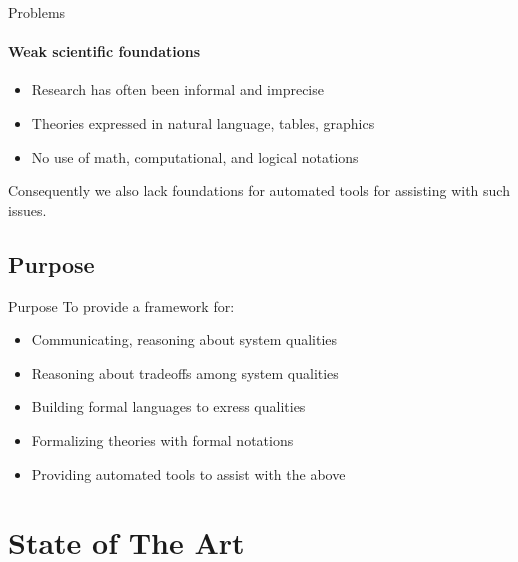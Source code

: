 \documentclass[xcolor=x11names,compress]{beamer}
\renewcommand{\(}{\begin{columns}}
\renewcommand{\)}{\end{columns}}
\newcommand{\<}[1]{\begin{column}{#1}}
\renewcommand{\>}{\end{column}}
\begin{document}
\begin{frame}{Problems}
\framesubtitle{Weak scientific foundations}
\begin{itemize}
\item Research has often been informal and imprecise
\item Theories expressed in natural language, tables, graphics
\item No use of math, computational, and logical notations
\end{itemize}
\vspace{0.5cm}
Consequently we also lack foundations for automated tools for assisting with such issues.
\end{frame}

\subsection{Purpose}
\begin{frame}{Purpose}
To provide a framework for:
\begin{itemize}
\item Communicating, reasoning about system qualities
\item Reasoning about tradeoffs among system qualities
\item Building formal languages to exress qualities
\item Formalizing theories with formal notations
\item Providing automated tools to assist with the above
\end{itemize}
\end{frame}

\section{State of The Art}
\end{document}
